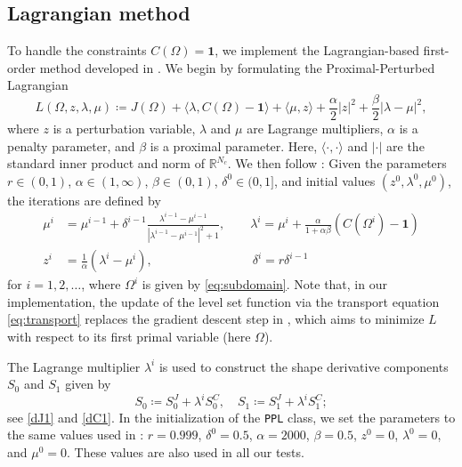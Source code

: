 \documentclass[preprint,9pt]{elsarticle}
\begin{document}
\subsection{Lagrangian method}\label{sub:lagrangian}

To handle the constraints $C(\Omega)=\boldsymbol{1}$,
we implement the Lagrangian-based first-order method
developed in \cite{MR4589221}.
We begin by formulating the Proximal-Perturbed Lagrangian
\[
	L(\Omega,z,\lambda,\mu) \coloneqq
	J(\Omega)+\langle\lambda, C(\Omega)-\boldsymbol{1}\rangle
	+\langle \mu, z \rangle+ \frac{\alpha}{2}|z|^2 +
	\frac{\beta}{2}|\lambda-\mu|^2,
\]
where $z$ is a perturbation variable,
$\lambda$ and $\mu$ are Lagrange multipliers,
$\alpha$ is a penalty parameter, and
$\beta$ is a proximal parameter.
Here, $\langle \cdot, \cdot \rangle$ and $\vert \cdot \vert$
are the standard inner product and norm of $\mathds{R}^{N_c}$.
We then follow \cite[Algorithm~1]{MR4589221}:
Given the parameters 
$r\in(0,1)$,
$\alpha\in(1,\infty)$, $\beta\in(0,1)$, 
$\delta^{0}\in(0,1]$, and initial values
$(z^{0},\lambda^{0},\mu^{0})$,
the iterations are defined by
\begin{equation}\label{eq:lag_method}
\begin{aligned}
	\mu^{i} &= \mu^{i-1}+\delta^{i-1}
	\tfrac{\lambda^{i-1}-\mu^{i-1}}{|\lambda^{i-1}-\mu^{i-1}|^{2} + 1},\qquad
	\lambda^{i} = \mu^{i}+
	\tfrac{\alpha}{1+\alpha\beta}(C(\Omega^{i})-\boldsymbol{1})\\
	z^{i} &= \tfrac{1}{\alpha}(\lambda^{i}-\mu^{i}),\qquad \qquad \qquad \qquad 
	\delta^{i} =r\delta^{i-1}
\end{aligned}
\end{equation}
for $i=1,2,\dots$, where $\Omega^{i}$ is given by \eqref{eq:subdomain}.
Note that, in our implementation, the update of the level set function
via the transport equation \eqref{eq:transport}
replaces the gradient descent step in \cite[Algorithm~1]{MR4589221},
which aims to minimize $L$ with respect
to its first primal variable (here $\Omega$).

The Lagrange multiplier $\lambda^i$ is used to construct
the shape derivative components $S_0$ and $S_1$ given by
\begin{equation}\label{eq:S0andS1}
	S_0\coloneqq S_0^{J} + \lambda^{i} S_0^{C},
	\quad
	S_1\coloneqq S_1^{J} + \lambda^{i} S_1^{C}; 	
\end{equation}
see \eqref{dJ1} and \eqref{dC1}.
In the initialization of the \texttt{PPL} class,
we set the parameters to the same values used in \cite{MR4589221}:
$r = 0.999$, $\delta^{0} = 0.5$,
$\alpha = 2000$, $\beta = 0.5$,
$z^{0} = 0$, $\lambda^{0} = 0$, and $\mu^{0} = 0$.
These values are also used in all our tests.
\end{document}
